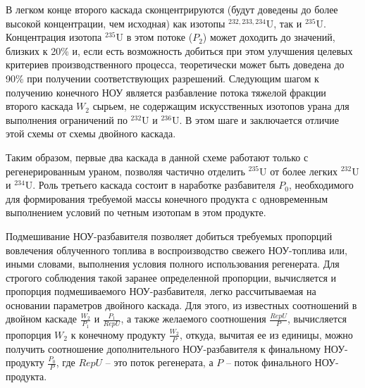В легком конце второго каскада сконцентрируются (будут доведены до более высокой концентрации, чем исходная) как изотопы $^{232,233,234}$U, так и $^{235}$U. Концентрация изотопа $^{235}$U в этом потоке ($P_2$) может доходить до значений, близких к 20\% и, если есть возможность добиться при этом улучшения целевых критериев производственного процесса, теоретически может быть доведена до 90\% при получении соответствующих разрешений. Следующим шагом к получению конечного НОУ является разбавление потока тяжелой фракции второго каскада $W_2$ сырьем, не содержащим искусственных изотопов урана для выполнения ограничений по $^{232}$U и $^{236}$U. В этом шаге и заключается отличие этой схемы от схемы двойного каскада.

Таким образом, первые два каскада в данной схеме работают только с регенерированным ураном, позволяя частично отделить $^{235}$U от более легких $^{232}$U и $^{234}$U. Роль третьего каскада состоит в наработке разбавителя $P_{0}$, необходимого для формирования требуемой массы конечного продукта с одновременным выполнением условий по четным изотопам в этом продукте.

Подмешивание НОУ-разбавителя позволяет добиться требуемых пропорций вовлечения облученного топлива в воспроизводство свежего НОУ-топлива или, иными словами, выполнения условия полного использования регенерата. Для строгого соблюдения такой заранее определенной пропорции, вычисляется и пропорция подмешиваемого НОУ-разбавителя, легко рассчитываемая на основании параметров двойного каскада. Для этого, из известных соотношений в двойном каскаде $\frac{W_{2}}{P_{1}}$ и $\frac{P_{1}}{RepU}$, а также желаемого соотношения $\frac{RepU}{P}$, вычисляется пропорция $W_2$ к конечному продукту $\frac{W_{2}}{P}$, откуда, вычитая ее из единицы, можно получить соотношение дополнительного НОУ-разбавителя к финальному НОУ-продукту $\frac{P_{0}}{P}$, где $RepU$ -- это поток регенерата, а $P$ -- поток финального НОУ-продукта.

